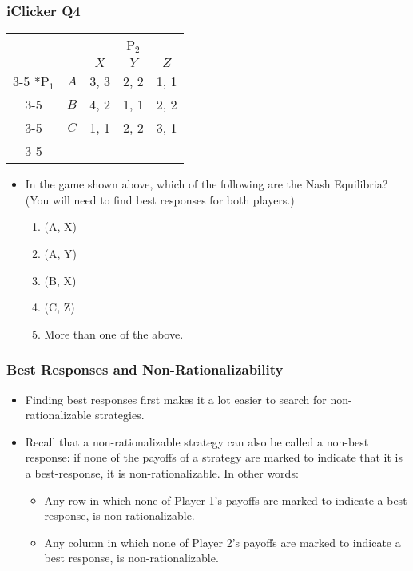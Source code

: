 \begin{frame}
\frametitle{iClicker Q4}
\begin{table}[h]
\centering
\begin{tabular}{cc|c|c|c|}
	& \multicolumn{1}{c}{} & \multicolumn{3}{c}{P$_2$}\\
	& \multicolumn{1}{c}{} & \multicolumn{1}{c}{$X$} & \multicolumn{1}{c}{$Y$} & \multicolumn{1}{c}{$Z$} \\\cline{3-5}
	\multirow{3}*{P$_1$}  & $A$ & 3, 3 & 2, 2 & 1, 1 \\\cline{3-5}
	& $B$ & 4, 2 & 1, 1 & 2, 2 \\\cline{3-5}
	& $C$ & 1, 1 & 2, 2 & 3, 1  \\\cline{3-5}
\end{tabular}
\end{table}
\begin{itemize}
\item In the game shown above, which of the following are the Nash Equilibria? (You will need to find best responses for both players.)
\begin{enumerate}
	\item (A, X)
	\item (A, Y)
	\item (B, X)
	\item (C, Z)
	\item More than one of the above.
\end{enumerate}
\end{itemize}
\end{frame}

\begin{frame}
\frametitle{Best Responses and Non-Rationalizability}
\begin{itemize}
	\item Finding best responses first makes it a lot easier to search for non-rationalizable strategies.
	\item Recall that a non-rationalizable strategy can also be called a non-best response: if none of the payoffs of a strategy are marked to indicate that it is a best-response, it is non-rationalizable. In other words:\begin{itemize}
		\item Any row in which none of Player 1's payoffs are marked to indicate a best response, is non-rationalizable.
		\item Any column in which none of Player 2's payoffs are marked to indicate a best response, is non-rationalizable.
	\end{itemize}
\end{itemize}
\end{frame}

